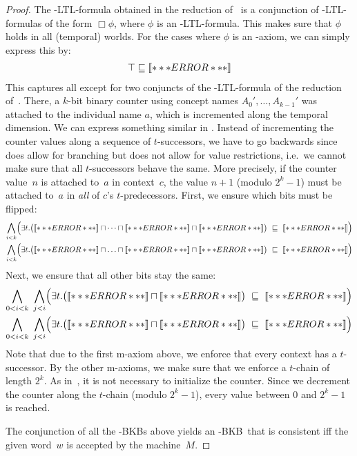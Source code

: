 \begin{proof}
  The \ALC-LTL-formula obtained in the reduction of~\cite{BaGL-KR08,BaGL-ToCL12} is a conjunction of
  \ALC-LTL-formulas of the form $\Box\phi$, where $\phi$ is an \ALC-LTL-formula.  This makes sure
  that $\phi$ holds in all (temporal) worlds.  For the cases where $\phi$ is an \ALC-axiom, we can
  simply express this by:
  \begin{gather*}
    \top\sqsubseteq\oax{\phi}
  \end{gather*}
  This captures all except for two conjuncts of the \ALC-LTL-formula of the reduction
  of~\cite{BaGL-KR08,BaGL-ToCL12}.  There, a $k$-bit binary counter using concept names
  $A_0',\dots,A_{k-1}'$ was attached to the individual name $a$, which is incremented along the
  temporal dimension.  We can express something similar in \ELALC. Instead of incrementing the
  counter values along a sequence of $t$-successors, we have to go backwards since \EL does allow
  for branching but does not allow for value restrictions, i.e.~we cannot make sure that all
  $t$-successors behave the same.  More precisely, if the counter value~$n$ is attached to~$a$ in
  context~$c$, the value $n+1$ (modulo $2^k-1$) must be attached to~$a$ in \emph{all} of $c$'s
  $t$-predecessors.
  First, we ensure which bits must be flipped:
  \begin{align*}
    \bigwedge_{i<k} \Bigl( \exists t.\bigl(\oax{A_{0}'(a)} \sqcap \dots \sqcap \oax{A_{i-1}'(a)} \sqcap \oax{A_{i}'(a)}\bigr)
    & \ \sqsubseteq\ \oax{(\lnot A_{i}')(a)}\Bigr)\\ 
    \bigwedge_{i<k}\Bigl( \exists t.\bigl(\oax{A_{0}'(a)}\sqcap\ldots\sqcap \oax{A_{i-1}'(a)} \sqcap \oax{(\lnot A_{i}')(a)}\bigr)
    & \ \sqsubseteq\ \oax{A_{i}'(a)}\Bigr)
  \end{align*}
  Next, we ensure that all other bits stay the same:
  \begin{align*}
    \bigwedge_{0<i<k}\ \bigwedge_{j<i}\Bigl(\exists t.\bigl(\oax{(\lnot A_{j}')(a)}\sqcap\oax{A_{i}'(a)}\bigr)
    & \ \sqsubseteq\ \oax{A_{i}'(a)}\Bigr)\\
    \bigwedge_{0<i<k}\ \bigwedge_{j<i}\Bigl(\exists t.\bigl(\oax{(\lnot A_{j}')(a)}\sqcap\oax{(\lnot A_{i}')(a)}\bigr)
    & \ \sqsubseteq\ \oax{(\lnot A_{i}')(a)}\Bigr)
  \end{align*}
  Note that due to the first m-axiom above, we enforce that every context has a $t$-successor.  By
  the other m-axioms, we make sure that we enforce a $t$-chain of length $2^k$.
  As in~\cite{BaGL-KR08,BaGL-ToCL12}, it is not necessary to initialize the counter.  Since we
  decrement the counter along the $t$-chain (modulo $2^k-1$), every value between $0$ and $2^k-1$
  is reached.
  
  The conjunction of all the \ELALC-BKBs above yields an \ELALC-BKB~\B that is consistent iff the
  given word~$w$
  is accepted by the machine~$M$.
\end{proof}

